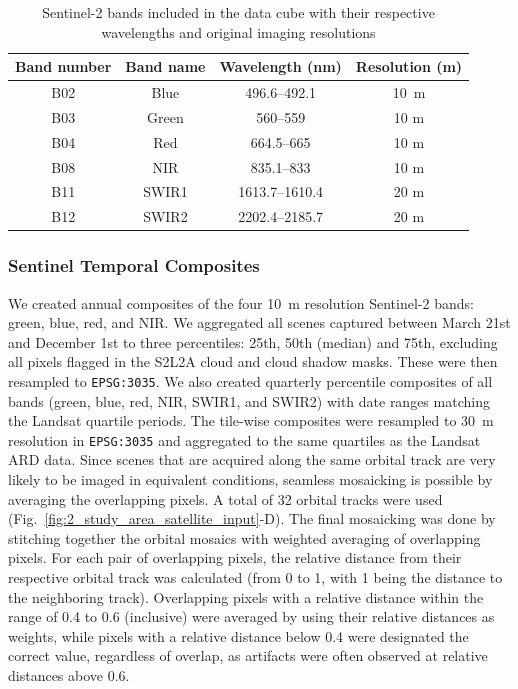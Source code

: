 \begin{table}[hbt]
\centering
\caption{Sentinel-2 bands included in the data cube with their respective wavelengths and original imaging resolutions}
\label{tab:s2_bands}
\begin{tabular}{@{}cccc@{}}
\hline
Band number & Band name & Wavelength (nm) & Resolution (m) \\
\hline
B02 & Blue & 496.6--492.1 & 10~m \\
B03 & Green & 560--559 & 10 m \\
B04 & Red & 664.5--665 & 10 m \\
B08 & NIR & 835.1--833 & 10 m \\
B11 & SWIR1 & 1613.7--1610.4 & 20 m \\
B12 & SWIR2 & 2202.4--2185.7 & 20 m \\
\hline
\end{tabular}
\end{table}



\subsubsection*{Sentinel Temporal Composites}

We created annual composites of the four 10~m resolution Sentinel-2 bands: green, blue, red, and NIR. We aggregated all scenes captured between March 21st and December 1st to three percentiles: 25th, 50th (median) and 75th, excluding all pixels flagged in the S2L2A cloud and cloud shadow masks. These were then resampled to \texttt{EPSG:3035}. We also created quarterly percentile composites of all bands (green, blue, red, NIR, SWIR1, and SWIR2) with date ranges matching the Landsat quartile periods. The tile-wise composites were resampled to 30~m resolution in \texttt{EPSG:3035} and aggregated to the same quartiles as the Landsat ARD data. Since scenes that are acquired along the same orbital track are very likely to be imaged in equivalent conditions, seamless mosaicking is possible by averaging the overlapping pixels. A total of 32 orbital tracks were used (Fig.\@~\ref{fig:2_study_area_satellite_input}-D). The final mosaicking was done by stitching together the orbital mosaics with weighted averaging of overlapping pixels. For each pair of overlapping pixels, the relative distance from their respective orbital track was calculated (from 0 to 1, with 1 being the distance to the neighboring track). Overlapping pixels with a relative distance within the range of 0.4 to 0.6 (inclusive) were averaged by using their relative distances as weights, while pixels with a relative distance below 0.4 were designated the correct value, regardless of overlap, as artifacts were often observed at relative distances above 0.6. 

